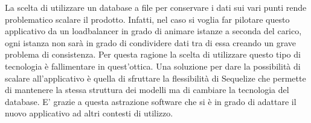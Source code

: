 \vspace{5mm}La scelta di utilizzare un database a file per conservare i dati sui vari punti rende problematico scalare il prodotto. Infatti, nel caso si voglia far pilotare questo applicativo da un loadbalancer\cite{LoadBalancing} in grado di animare istanze a seconda del carico, ogni istanza non sarà in grado di condividere dati tra di essa creando un grave problema di consistenza. Per questa ragione la scelta di utilizzare questo tipo di tecnologia è fallimentare in quest'ottica. Una soluzione per dare la possibilità di scalare all'applicativo è quella di sfruttare la flessibilità di Sequelize\cite{Sequelize} che permette di mantenere la stessa struttura dei modelli ma di cambiare la tecnologia del database. E' grazie a questa astrazione software che si è in grado di adattare il nuovo applicativo ad altri contesti di utilizzo.








